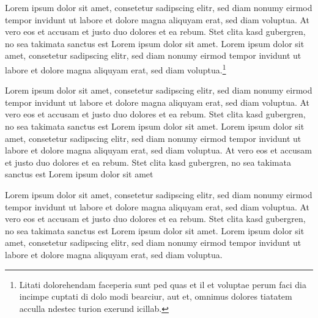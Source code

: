 Lorem ipsum dolor sit amet, consetetur sadipscing elitr, sed diam nonumy eirmod tempor invidunt ut labore et dolore magna aliquyam erat, sed diam voluptua. At vero eos et accusam et justo duo dolores et ea rebum. Stet clita kasd gubergren, no sea takimata sanctus est Lorem ipsum dolor sit amet. Lorem ipsum dolor sit amet, consetetur sadipscing elitr, sed diam nonumy eirmod tempor invidunt ut labore et dolore magna aliquyam erat, sed diam voluptua.\footnote{Litati dolorehendam faceperia sunt ped quas et il et voluptae perum faci dia incimpe cuptati di dolo modi bearciur, aut et, omnimus dolores tiatatem acculla ndestec turion exerund icillab.}

Lorem ipsum dolor sit amet, consetetur sadipscing elitr, sed diam nonumy eirmod tempor invidunt ut labore et dolore magna aliquyam erat, sed diam voluptua. At vero eos et accusam et justo duo dolores et ea rebum. Stet clita kasd gubergren, no sea takimata sanctus est Lorem ipsum dolor sit amet. Lorem ipsum dolor sit amet, consetetur sadipscing elitr, sed diam nonumy eirmod tempor invidunt ut labore et dolore magna aliquyam erat, sed diam voluptua. At vero eos et accusam et justo duo dolores et ea rebum. Stet clita kasd gubergren, no sea takimata sanctus est Lorem ipsum dolor sit amet

Lorem ipsum dolor sit amet, consetetur sadipscing elitr, sed diam nonumy eirmod tempor invidunt ut labore et dolore magna aliquyam erat, sed diam voluptua. At vero eos et accusam et justo duo dolores et ea rebum. Stet clita kasd gubergren, no sea takimata sanctus est Lorem ipsum dolor sit amet. Lorem ipsum dolor sit amet, consetetur sadipscing elitr, sed diam nonumy eirmod tempor invidunt ut labore et dolore magna aliquyam erat, sed diam voluptua.